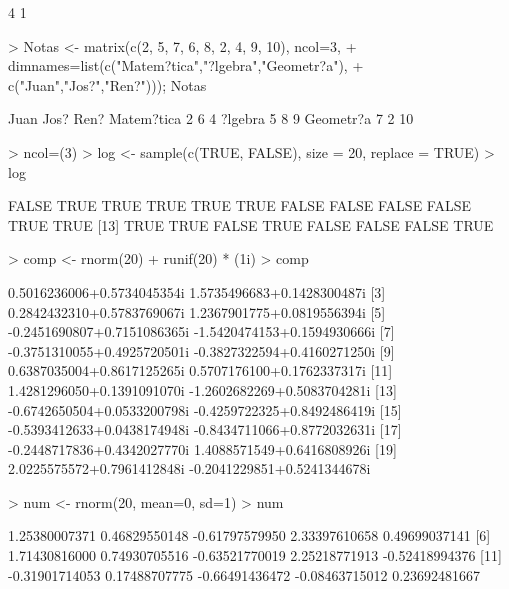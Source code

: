 \documentclass{article}
\begin{document}
\begin{Schunk}
\begin{Soutput}
[1] 4 1
\end{Soutput}
\begin{Sinput}
> Notas <- matrix(c(2, 5, 7, 6, 8, 2, 4, 9, 10), ncol=3,
+                 dimnames=list(c("Matem?tica","?lgebra","Geometr?a"),
+                               c("Juan","Jos?","Ren?"))); Notas
\end{Sinput}
\begin{Soutput}
           Juan Jos? Ren?
Matem?tica    2    6    4
?lgebra       5    8    9
Geometr?a     7    2   10
\end{Soutput}
\begin{Sinput}
> ncol=(3)
> log <- sample(c(TRUE, FALSE), size = 20, replace = TRUE)
> log
\end{Sinput}
\begin{Soutput}
 [1] FALSE  TRUE  TRUE  TRUE  TRUE  TRUE FALSE FALSE FALSE FALSE  TRUE  TRUE
[13]  TRUE  TRUE FALSE  TRUE FALSE FALSE FALSE  TRUE
\end{Soutput}
\begin{Sinput}
> comp <- rnorm(20) + runif(20) * (1i)
> comp
\end{Sinput}
\begin{Soutput}
 [1]  0.5016236006+0.5734045354i  1.5735496683+0.1428300487i
 [3]  0.2842432310+0.5783769067i  1.2367901775+0.0819556394i
 [5] -0.2451690807+0.7151086365i -1.5420474153+0.1594930666i
 [7] -0.3751310055+0.4925720501i -0.3827322594+0.4160271250i
 [9]  0.6387035004+0.8617125265i  0.5707176100+0.1762337317i
[11]  1.4281296050+0.1391091070i -1.2602682269+0.5083704281i
[13] -0.6742650504+0.0533200798i -0.4259722325+0.8492486419i
[15] -0.5393412633+0.0438174948i -0.8434711066+0.8772032631i
[17] -0.2448717836+0.4342027770i  1.4088571549+0.6416808926i
[19]  2.0225575572+0.7961412848i -0.2041229851+0.5241344678i
\end{Soutput}
\begin{Sinput}
> num <- rnorm(20, mean=0, sd=1)
> num
\end{Sinput}
\begin{Soutput}
 [1]  1.25380007371  0.46829550148 -0.61797579950  2.33397610658  0.49699037141
 [6]  1.71430816000  0.74930705516 -0.63521770019  2.25218771913 -0.52418994376
[11] -0.31901714053  0.17488707775 -0.66491436472 -0.08463715012  0.23692481667

\end{Soutput}
\end{Schunk}
\end{document}
